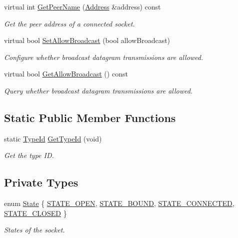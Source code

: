 \begin{DoxyCompactItemize}
virtual int \hyperlink{classns3_1_1PacketSocket_a2a8bd0a6624593cb7d6b4171dd173049}{Get\+Peer\+Name} (\hyperlink{classns3_1_1Address}{Address} \&address) const 
\begin{DoxyCompactList}\small\item\em Get the peer address of a connected socket. \end{DoxyCompactList}\item 
virtual bool \hyperlink{classns3_1_1PacketSocket_a0d903ba3ca9ad905a9c347254ae6a9b9}{Set\+Allow\+Broadcast} (bool allow\+Broadcast)
\begin{DoxyCompactList}\small\item\em Configure whether broadcast datagram transmissions are allowed. \end{DoxyCompactList}\item 
virtual bool \hyperlink{classns3_1_1PacketSocket_a831b498999fd1d3852512009df3e7cba}{Get\+Allow\+Broadcast} () const 
\begin{DoxyCompactList}\small\item\em Query whether broadcast datagram transmissions are allowed. \end{DoxyCompactList}\end{DoxyCompactItemize}
\subsection*{Static Public Member Functions}
\begin{DoxyCompactItemize}
\item 
static \hyperlink{classns3_1_1TypeId}{Type\+Id} \hyperlink{classns3_1_1PacketSocket_aa6d6009b60e1d9b8b6af64446bb68282}{Get\+Type\+Id} (void)
\begin{DoxyCompactList}\small\item\em Get the type ID. \end{DoxyCompactList}\end{DoxyCompactItemize}
\subsection*{Private Types}
\begin{DoxyCompactItemize}
\item 
enum \hyperlink{classns3_1_1PacketSocket_a376c65cdab494c41bd65f9aaeef543e5}{State} \{ \hyperlink{classns3_1_1PacketSocket_a376c65cdab494c41bd65f9aaeef543e5af534e442cba41165df3d12c889608f03}{S\+T\+A\+T\+E\+\_\+\+O\+P\+EN}, 
\hyperlink{classns3_1_1PacketSocket_a376c65cdab494c41bd65f9aaeef543e5a22a3caeaebc3bfbb85d13fc9a807162a}{S\+T\+A\+T\+E\+\_\+\+B\+O\+U\+ND}, 
\hyperlink{classns3_1_1PacketSocket_a376c65cdab494c41bd65f9aaeef543e5abba9e14603bb16ef4fa03ddfc1224641}{S\+T\+A\+T\+E\+\_\+\+C\+O\+N\+N\+E\+C\+T\+ED}, 
\hyperlink{classns3_1_1PacketSocket_a376c65cdab494c41bd65f9aaeef543e5a6fe4f17ed49f9a87aba67738af434437}{S\+T\+A\+T\+E\+\_\+\+C\+L\+O\+S\+ED}
 \}\begin{DoxyCompactList}\small\item\em States of the socket. \end{DoxyCompactList}
\end{DoxyCompactItemize}
